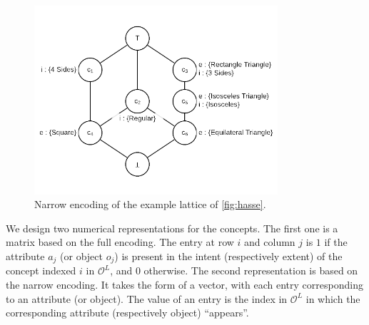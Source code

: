 \begin{figure}
    \centering
    \includegraphics[keepaspectratio, height=7cm, width=.9\textwidth]{Figures/Ch0/example_narrow.png}
    \caption{Narrow encoding of the example lattice of \cref{fig:hasse}.}
    \label{fig:encoding}
\end{figure}

We design two numerical representations for the concepts.
The first one is a matrix based on the full encoding.
The entry at row $i$ and column $j$ is $1$ if the attribute $a_j$ (or object $o_j$) is present in the intent (respectively extent) of the concept indexed $i$ in $\mathcal{O}^L$, and $0$ otherwise.
The second representation is based on the narrow encoding. It takes the form of a vector, with each entry corresponding to an attribute (or object).
The value of an entry is the index in $\mathcal{O}^L$ in which the corresponding attribute (respectively object) ``appears''.


